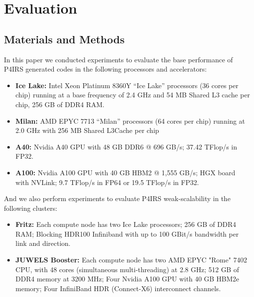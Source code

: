 \documentclass[preprint,12pt]{elsarticle}
\begin{document}
\section{Evaluation}
\label{sec:evaluation}


\subsection{Materials and Methods}

In this paper we conducted experiments to evaluate the base performance of P4IRS generated codes in the following processors and accelerators:

\begin{itemize}
  \item \textbf{Ice Lake:} Intel Xeon Platinum 8360Y “Ice Lake” processors (36 cores per chip) running at a base frequency of 2.4 GHz and 54 MB Shared L3 cache per chip, 256 GB of DDR4 RAM.
  \item \textbf{Milan:} AMD EPYC 7713 “Milan” processors (64 cores per chip) running at 2.0 GHz with 256 MB Shared L3Cache per chip
  \item \textbf{A40:} Nvidia A40 GPU with 48 GB DDR6 @ 696 GB/s; 37.42 TFlop/s in FP32.
  \item \textbf{A100:} Nvidia A100 GPU with 40 GB HBM2 @ 1,555 GB/s; HGX board with NVLink; 9.7 TFlop/s in FP64 or 19.5 TFlop/s in FP32.
\end{itemize}

And we also perform experiments to evaluate P4IRS weak-scalability in the following clusters:

\begin{itemize}
  \item \textbf{Fritz:} Each compute node has two Ice Lake processors; 256 GB of DDR4 RAM; Blocking HDR100 Infiniband with up to 100 GBit/s bandwidth per link and direction.
  \item \textbf{JUWELS Booster:} Each compute node has two AMD EPYC "Rome" 7402 CPU, with 48 cores (simultaneous multi-threading) at 2.8 GHz; 512 GB of DDR4 memory at 3200 MHz; Four Nvidia A100 GPU with 40 GB HBM2e memory; Four InfiniBand HDR (Connect-X6) interconnect channels.
\end{itemize}
\end{document}
